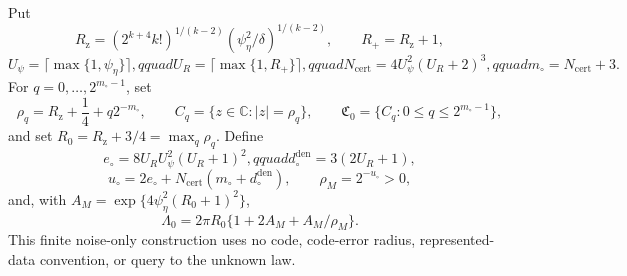 Put
\[
 R_{\mathrm z}=(2^{k+4}k!)^{1/(k-2)}
 (\psi_\eta^2/\delta)^{1/(k-2)},\qquad R_+=R_{\mathrm z}+1,
\]
\[
 U_\psi=\lceil\max\{1,\psi_\eta\}\rceil,qquad
 U_R=\lceil\max\{1,R_+\}\rceil,qquad
 N_{\mathrm{cert}}=4U_\psi^2(U_R+2)^3,qquad
 m_\circ=N_{\mathrm{cert}}+3.
\]
For \(q=0,\ldots,2^{m_\circ-1}\), set
\[
 \rho_q=R_{\mathrm z}+\frac14+q2^{-m_\circ},
 \qquad C_q=\{z\in\mathbb C:|z|=\rho_q\},
 \qquad \mathfrak C_0=\{C_q:0\le q\le2^{m_\circ-1}\},
\]
and set \(R_0=R_{\mathrm z}+3/4=\max_q\rho_q\).  Define
\[
 e_\circ=8U_RU_\psi^2(U_R+1)^2,qquad
 d_\circ^{\mathrm{den}}=3(2U_R+1),
\]
\[
 u_\circ=2e_\circ+N_{\mathrm{cert}}(m_\circ+d_\circ^{\mathrm{den}}),
 \qquad \rho_M=2^{-u_\circ}>0,
\]
and, with \(A_M=\exp\{4\psi_\eta^2(R_0+1)^2\}\),
\[
 \Lambda_0=2\pi R_0\{1+2A_M+A_M/\rho_M\}.
\]
This finite noise-only construction uses no code, code-error radius, represented-data convention, or query to the unknown law.